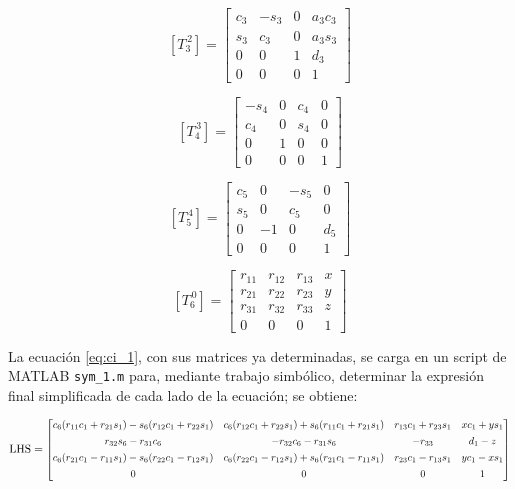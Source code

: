 \documentclass{article}
\begin{document}
\[
\left[T_3^{\,2}\right] =
\begin{bmatrix}
c_3 & -s_3 & 0 & a_3 c_3 \\
s_3 & c_3 & 0 & a_3 s_3 \\
0 & 0 & 1 & d_3 \\
0 & 0 & 0 & 1
\end{bmatrix}
\]

\[
\left[T_4^{\,3}\right] =
\begin{bmatrix}
- s_4 & 0 & c_4 & 0 \\
c_4 & 0 & s_4 & 0 \\
0 & 1 & 0 & 0 \\
0 & 0 & 0 & 1
\end{bmatrix}
\]

\[
\left[T_5^{\,4}\right] =
\begin{bmatrix}
c_5 & 0 & -s_5 & 0 \\
s_5 & 0 & c_5 & 0 \\
0 & -1 & 0 & d_5 \\
0 & 0 & 0 & 1
\end{bmatrix}
\]

\[
\left[T_6^{\,0}\right] =
\begin{bmatrix}
r_{11} & r_{12} & r_{13} & x \\
r_{21} & r_{22} & r_{23} & y \\
r_{31} & r_{32} & r_{33} & z \\
0 & 0 & 0 & 1
\end{bmatrix}
\]

La ecuación \ref{eq:ci_1}, con sus matrices ya determinadas, se carga en un script de MATLAB \colorbox{gray!20}{\texttt{sym\_1.m}} para, mediante trabajo simbólico, determinar la expresión final simplificada de cada lado de la ecuación; se obtiene:

\begin{equation*}
\text{LHS} = \scalebox{0.9}{\ensuremath{%
\begin{bmatrix}
c_6 (r_{11}c_1 + r_{21}s_1) - s_6 (r_{12}c_1 + r_{22}s_1) &
c_6 (r_{12}c_1 + r_{22}s_1) + s_6 (r_{11}c_1 + r_{21}s_1) &
r_{13}c_1 + r_{23}s_1 &
x c_1 + y s_1 \\[4pt]
r_{32}s_6 - r_{31}c_6 &
- r_{32}c_6 - r_{31}s_6 &
- r_{33} &
d_1- z \\[4pt]
c_6 (r_{21}c_1 - r_{11}s_1) - s_6 (r_{22}c_1 - r_{12}s_1) &
c_6 (r_{22}c_1 - r_{12}s_1) + s_6 (r_{21}c_1 - r_{11}s_1) &
r_{23}c_1 - r_{13}s_1 &
y c_1 - x s_1 \\[4pt]
0 & 0 & 0 & 1
\end{bmatrix}}}
\end{equation*}
\end{document}
